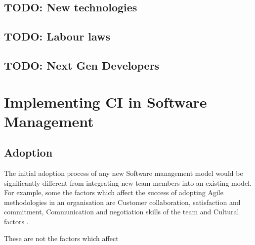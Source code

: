 \documentclass[10pt,conference]{IEEEtran}
\begin{document}
\subsection*{TODO: New technologies}
\subsection*{TODO: Labour laws}
\subsection*{TODO: Next Gen Developers}

\section*{Implementing CI in Software Management}

\subsection*{Adoption}
The initial adoption process of any new Software management model would be significantly different from integrating new team members into an existing model. For example, some the factors which affect the success of adopting Agile methodologies in an organisation are 
Customer collaboration, satisfaction and commitment, Communication and negotiation skills of the team and Cultural factors \cite{misra_identifying_2009}.

These are not the factors which affect 



\end{document}
